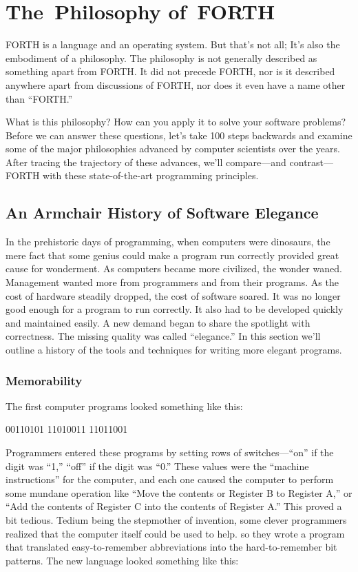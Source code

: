 \chapter{The~Philosophy of~FORTH}


FORTH is a language and an operating system. But that's not all; It's
also the embodiment of a philosophy. The philosophy is not generally
described as something apart from FORTH. It did not precede FORTH,
nor is it described anywhere apart from discussions of FORTH, nor
does it even have a name other than ``FORTH.''

What is this philosophy? How can you apply it to solve your software
problems? Before we can answer these questions, let's take 100 steps
backwards and examine some of the major philosophies advanced by computer
scientists over the years. After tracing the trajectory of these advances,
we'll compare---and contrast---FORTH with these state-of-the-art programming
principles.


\section{An Armchair History of Software Elegance}
In the prehistoric days of programming, when computers were dinosaurs,
the mere fact that some genius could make a program run correctly
provided great cause for wonderment. As computers became more civilized,
the wonder waned. Management wanted more from programmers and from
their programs. As the cost of hardware steadily dropped, the cost
of software soared. It was no longer good enough for a program to
run correctly. It also had to be developed quickly and maintained
easily. A new demand began to share the spotlight with correctness.
The missing quality was called ``elegance.'' In this section we'll
outline a history of the tools and techniques for writing more elegant
programs.


\subsection{Memorability}
The first computer programs looked something like this:

\begin{Code}
00110101
11010011
11011001
\end{Code}
Programmers entered these programs by setting rows of switches---``on''
if the digit was {}``1,'' ``off'' if the digit was ``0.'' These
values were the {}``machine instructions'' for the computer, and
each one caused the computer to perform some mundane operation like
``Move the contents or Register B to Register A,'' or {}``Add the
contents of Register C into the contents of Register A.'' This proved
a bit tedious. Tedium being the stepmother of invention, some clever
programmers realized that the computer itself could be used to help.
so they wrote a program that translated easy-to-remember abbreviations
into the hard-to-remember bit patterns. The new language looked something
like this:

